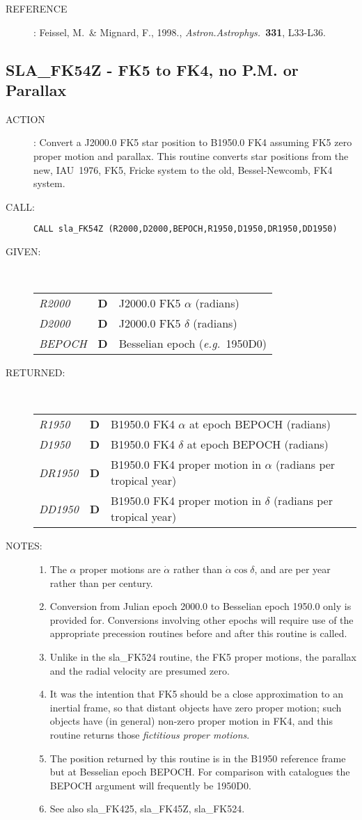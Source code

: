 \documentclass[11pt,twoside]{article}
\newcommand{\xlabel}[1]{}
\newcommand{\routine}[3]
{\hbadness=10000
  \vbox
  {
    \rule{\textwidth}{0.3mm}\\
    {\Large {\bf #1} \hfill #2 \hfill {\bf #1}}\\
    \setlength{\oldspacing}{\topsep}
    \setlength{\topsep}{0.3ex}
    \begin{description}
      #3
    \end{description}
    \setlength{\topsep}{\oldspacing}
  }
}
\renewcommand{\routine}[3]
   {
      \subsection{#1\xlabel{#1} - #2\label{#1}}
       \begin{description}
         #3
       \end{description}
   }
\newcommand{\action}[1]
{\item[ACTION]: #1}
\newcommand{\action}[1]
   {\item[ACTION:] #1}
\newcommand{\call}[1]
{\item[CALL]: \hspace{0.4em}{\tt #1}}
\newlength{\oldspacing}
\renewcommand{\call}[1]
   {
    \item[CALL:] {\tt #1}
   }
\newcommand{\args}[2]
{
  \goodbreak
  \setlength{\oldspacing}{\topsep}
  \setlength{\topsep}{0.3ex}
  \begin{description}
  \item[#1]:\\[1.5ex]
    \begin{tabular}{p{7em}p{6em}p{22em}}
      #2
    \end{tabular}
  \end{description}
  \setlength{\topsep}{\oldspacing}
}
\renewcommand{\args}[2]
   {
     \begin{description}
        \item[#1:]\\
        \begin{tabular}{p{7em}p{6em}l}
           #2
        \end{tabular}
     \end{description}
   }
\newcommand{\spec}[3]
{
  {\em {#1}} & {\bf \mbox{#2}} & {#3}
}
\newcommand{\notes}[1]
{
  \goodbreak
  \setlength{\oldspacing}{\topsep}
  \setlength{\topsep}{0.3ex}
  \begin{description}
    \item[NOTES]:
        #1
  \end{description}
  \setlength{\topsep}{\oldspacing}
}
\renewcommand{\notes}[1]
   {
      \begin{description}
         \item[NOTES:]
            #1
      \end{description}
   }
\newcommand{\aref}[1]
{
  \goodbreak
  \setlength{\oldspacing}{\topsep}
  \setlength{\topsep}{0.3ex}
  \begin{description}
    \item[REFERENCE]:
        #1
  \end{description}
  \setlength{\topsep}{\oldspacing}
}
\newcommand{\aref}[1]
   {
     \begin{description}
       \item[REFERENCE:]
           #1
     \end{description}
   }
\begin{document}
\aref {Feissel, M.\ \& Mignard, F., 1998.,  {\it Astron.Astrophys.}\
       {\bf 331}, L33-L36.}
\routine{SLA\_FK54Z}{FK5 to FK4, no P.M. or Parallax}
{
 \action{Convert a J2000.0 FK5 star position to B1950.0 FK4 assuming
         FK5 zero proper motion and parallax.
         This routine converts star positions from the new, IAU~1976,
         FK5, Fricke system to the old, Bessel-Newcomb, FK4 system.}
 \call{CALL sla\_FK54Z (R2000,D2000,BEPOCH,R1950,D1950,DR1950,DD1950)}
}
\args{GIVEN}
{
 \spec{R2000}{D}{J2000.0 FK5 $\alpha$ (radians)} \\
 \spec{D2000}{D}{J2000.0 FK5 $\delta$ (radians)} \\
 \spec{BEPOCH}{D}{Besselian epoch ({\it e.g.}\ 1950D0)}
}
\args{RETURNED}
{
 \spec{R1950}{D}{B1950.0 FK4 $\alpha$ at epoch BEPOCH (radians)} \\
 \spec{D1950}{D}{B1950.0 FK4 $\delta$ at epoch BEPOCH (radians)} \\
 \spec{DR1950}{D}{B1950.0 FK4 proper motion in $\alpha$
                              (radians per tropical year)} \\
 \spec{DD1950}{D}{B1950.0 FK4 proper motion in $\delta$
                              (radians per tropical year)}
}
\notes
{
 \begin{enumerate}
  \item The $\alpha$ proper motions are $\dot{\alpha}$ rather than
        $\dot{\alpha}\cos\delta$, and are per year rather than per century.
  \item Conversion from Julian epoch 2000.0 to Besselian epoch 1950.0
        only is provided for.  Conversions involving other epochs will
        require use of the appropriate precession routines before and
        after this routine is called.
  \item Unlike in the sla\_FK524 routine, the FK5 proper motions, the
        parallax and the radial velocity are presumed zero.
  \item It was the intention that FK5 should be a close approximation
        to an inertial frame, so that distant objects have zero proper
        motion;  such objects have (in general) non-zero proper motion
        in FK4, and this routine returns those {\it fictitious proper
        motions}.
  \item The position returned by this routine is in the B1950
        reference frame but at Besselian epoch BEPOCH.  For
        comparison with catalogues the BEPOCH argument will
        frequently be 1950D0.
  \item See also sla\_FK425, sla\_FK45Z, sla\_FK524.
 \end{enumerate}
}
\end{document}

